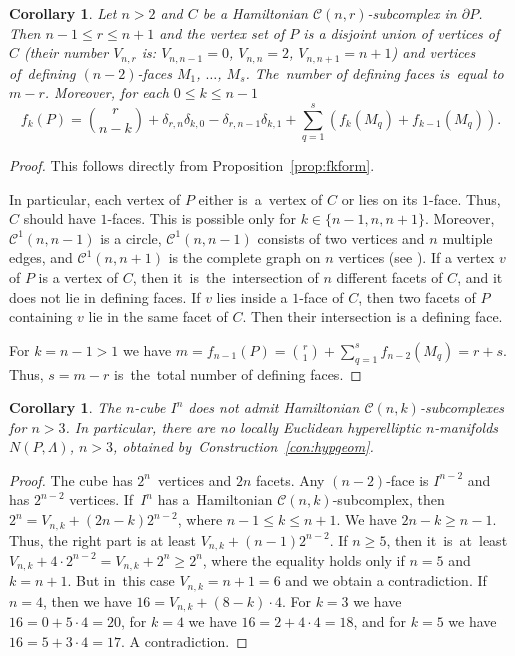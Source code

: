 \documentclass[12pt]{amsart}
\newtheorem{corollary}[formula]{Corollary}
\theoremstyle{definition}
\theoremstyle{remark}
\begin{document}
\begin{corollary}
Let $n>2$ and $C$ be a Hamiltonian $\mathcal{C}(n,r)$-subcomplex in $\partial P$. Then $n-1\leqslant r\leqslant n+1$ and 
the vertex set of $P$ is a disjoint union of vertices of $C$ (their number $V_{n,r}$ is: $V_{n,n-1}=0$, $V_{n,n}=2$, 
$V_{n,n+1}=n+1$) 
and vertices of~defining $(n-2)$-faces $M_1$, $\dots$, $M_s$. The~number of defining faces is~equal to $m-r$.
Moreover, for each $0\leqslant k\leqslant n-1$
$$
f_k(P)= {r\choose n-k}+\delta_{r,n}\delta_{k,0}-\delta_{r,n-1}\delta_{k,1} +\sum\limits_{q=1}^s\left(f_k(M_q)+f_{k-1}(M_q)\right).
$$
\end{corollary}
\begin{proof}
This follows directly from Proposition~\ref{prop:fkform}.

In particular, each vertex of $P$  either is~a~vertex of $C$ or lies on its $1$-face. Thus, $C$ should have $1$-faces. This
is possible only for $k\in\{n-1,n,n+1\}$. Moreover, $\mathcal{C}^1(n,n-1)$ is a circle, $\mathcal{C}^1(n,n-1)$ consists
of two vertices and $n$ multiple edges, and $\mathcal{C}^1(n,n+1)$ is the complete graph on $n$ vertices 
(see \cite[Example 8.17]{E24}). If a vertex $v$ of $P$ is a vertex of $C$, then it~is~the~intersection of $n$
different facets of $C$, and it does not lie in defining faces. If $v$ lies inside a $1$-face of $C$, then  
two facets of $P$ containing $v$ lie in the same facet of $C$. Then their intersection is a defining face.

For $k=n-1>1$ we have $m=f_{n-1}(P)={r\choose 1}+\sum\limits_{q=1}^sf_{n-2}(M_q)=r+s$. Thus, $s=m-r$
is~the~total number of defining faces.
\end{proof}
\begin{corollary}\label{cor:In}
The $n$-cube $I^n$ does not admit Hamiltonian $\mathcal{C}(n,k)$-subcomplexes for $n>3$. In particular,
there are no locally Euclidean hyperelliptic $n$-manifolds $N(P,\Lambda)$, $n>3$, obtained by~Construction~\ref{con:hypgeom}.
\end{corollary}
\begin{proof}
The cube has $2^n$~vertices and $2n$ facets. Any $(n-2)$-face is $I^{n-2}$ and has $2^{n-2}$ vertices.
If~$I^n$ has a~Hamiltonian $\mathcal{C}(n,k)$-subcomplex, then $2^n=V_{n,k}+(2n-k)2^{n-2}$,
where $n-1\leqslant k\leqslant n+1$. We have $2n-k\geqslant n-1$. Thus, the right part
is at least $V_{n,k}+(n-1)2^{n-2}$. If $n\geqslant 5$, then it~is~at~least $V_{n,k}+4\cdot 2^{n-2}=V_{n,k}+2^n\geqslant 2^n$,
where the equality holds only if $n=5$ and $k=n+1$. But in~this case $V_{n,k}=n+1=6$ and we obtain a contradiction.
If $n=4$, then we have $16=V_{n,k}+(8-k)\cdot 4$. For $k=3$ we have $16=0+5\cdot 4=20$, 
for $k=4$ we have $16=2+4\cdot 4=18$, and for $k=5$ we have $16=5+3\cdot 4=17$. A contradiction. 
\end{proof}
\end{document}
